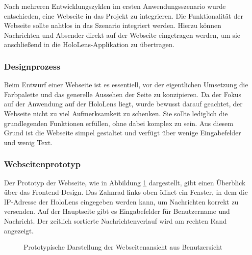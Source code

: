 Nach mehreren Entwicklungszyklen im ersten Anwendungsszenario wurde entschieden, eine Webseite in das Projekt zu
integrieren. Die Funktionalität der Webseite sollte nahtlos in das Szenario integriert werden. Hierzu können Nachrichten
und Absender direkt auf der Webseite eingetragen werden, um sie anschließend in die HoloLens-Applikation zu übertragen.

\subsubsection{Designprozess}
Beim Entwurf einer Webseite ist es essentiell, vor der eigentlichen Umsetzung die Farbpalette und das generelle Aussehen
der Seite zu konzipieren. Da der Fokus auf der Anwendung auf der HoloLens liegt, wurde bewusst darauf geachtet, der
Webseite nicht zu viel Aufmerksamkeit zu schenken. Sie sollte lediglich die grundlegenden Funktionen erfüllen, ohne dabei
komplex zu sein. Aus diesem Grund ist die Webseite simpel gestaltet und verfügt über wenige Eingabefelder und wenig Text.

\subsubsection*{Webseitenprototyp}
Der Prototyp der Webseite, wie in Abbildung \ref{fig:protfrontend} dargestellt, gibt einen Überblick über das
Frontend-Design. Das Zahnrad links oben öffnet ein Fenster, in dem die IP-Adresse der HoloLens eingegeben werden kann,
um Nachrichten korrekt zu versenden. Auf der Hauptseite gibt es Eingabefelder für Benutzername und Nachricht. Der zeitlich
sortierte Nachrichtenverlauf wird am rechten Rand angezeigt.

\begin{figure}[H]
    \centering
    \caption{Prototypische Darstellung der Webseitenansicht aus Benutzersicht}
    \label{fig:protfrontend}
\end{figure}

